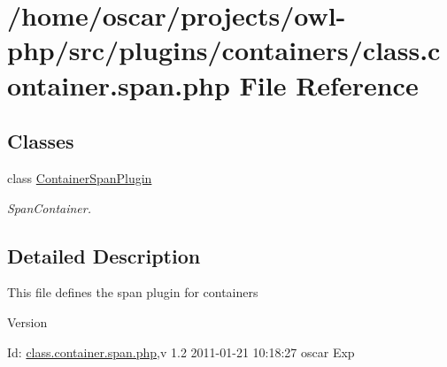 \section{/home/oscar/projects/owl-\/php/src/plugins/containers/class.container.span.php File Reference}
\label{class_8container_8span_8php}
\subsection*{Classes}
\begin{DoxyCompactItemize}
\item 
class \hyperlink{classContainerSpanPlugin}{ContainerSpanPlugin}
\begin{DoxyCompactList}\small\item\em SpanContainer. \item\end{DoxyCompactList}\end{DoxyCompactItemize}


\subsection{Detailed Description}
This file defines the span plugin for containers \begin{DoxyVersion}{Version}

\end{DoxyVersion}
\begin{DoxyParagraph}{Id:}
\hyperlink{class_8container_8span_8php}{class.container.span.php},v 1.2 2011-\/01-\/21 10:18:27 oscar Exp 
\end{DoxyParagraph}
